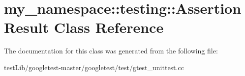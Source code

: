 \hypertarget{classmy__namespace_1_1testing_1_1AssertionResult}{}\section{my\+\_\+namespace\+:\+:testing\+:\+:Assertion\+Result Class Reference}
\label{classmy__namespace_1_1testing_1_1AssertionResult}


The documentation for this class was generated from the following file\+:\begin{DoxyCompactItemize}
\item 
test\+Lib/googletest-\/master/googletest/test/gtest\+\_\+unittest.\+cc\end{DoxyCompactItemize}
